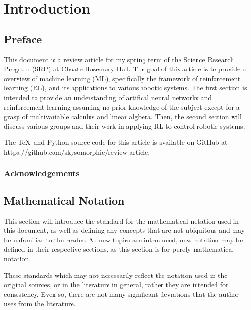 \documentclass[12pt]{report}
\theoremstyle{definition}
\theoremstyle{remark}
\begin{document}


\tableofcontents

\chapter{Introduction}
\section{Preface}
This document is a review article for my spring term of the Science Research Program (SRP) at Choate Rosemary Hall. The goal of this article is to provide a overview of machine learning (ML), specifically the framework of reinforcement learning (RL), and its applications to various robotic systems. The first section is intended to provide an understanding of artifical neural networks and reinforcement learning assuming no prior knowledge of the subject except for a grasp of multivariable calculus and linear algbera. Then, the second section will discuss various groups and their work in applying RL to control robotic systems.

The \TeX~and Python source code for this article is available on GitHub at \url{https://github.com/skysomorphic/review-article}.

\subsection{Acknowledgements}

\section{Mathematical Notation}\label{notation}
This section will introduce the standard for the mathematical notation used in this document, as well as defining any concepts that are not ubiquitous and may be unfamiliar to the reader. As new topics are introduced, new notation may be defined in their respective sections, as this section is for purely mathematical notation.

These standards which may not necessarily reflect the notation used in the original sources, or in the literature in general, rather they are intended for consistency. Even so, there are not many significant deviations that the author uses from the literature.
\end{document}

